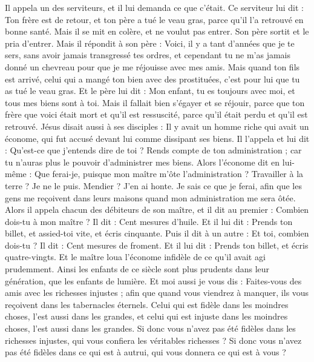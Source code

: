 \begin{multicols}{2}
{Il appela un des serviteurs, et il lui demanda ce que c'était.
Ce serviteur lui dit : Ton frère est de retour, et ton père a tué le veau gras, parce qu'il l'a retrouvé en bonne santé.
Mais il se mit en colère, et ne voulut pas entrer. Son père sortit et le pria d'entrer.
Mais il répondit à son père : Voici, il y a tant d'années que je te sers, sans avoir jamais transgressé tes ordres, et cependant tu ne m'as jamais donné un chevreau pour que je me réjouisse avec mes amis.
Mais quand ton fils est arrivé, celui qui a mangé ton bien avec des prostituées, c’est pour lui que tu as tué le veau gras.
Et le père lui dit : Mon enfant, tu es toujours avec moi, et tous mes biens sont à toi.
Mais il fallait bien s’égayer et se réjouir, parce que ton frère que voici était mort et qu’il est ressuscité, parce qu’il était perdu et qu’il est retrouvé.
\VerseOne{}Jésus disait aussi à ses disciples : Il y avait un homme riche qui avait un économe, qui fut accusé devant lui comme dissipant ses biens.
Il l’appela et lui dit : Qu’est-ce que j'entends dire de toi ? Rends compte de ton administration ; car tu n'auras plus le pouvoir d'administrer mes biens.
Alors l'économe dit en lui-même : Que ferai-je, puisque mon maître m'ôte l'administration ? Travailler à la terre ? Je ne le puis. Mendier ? J’en ai honte.
Je sais ce que je ferai, afin que les gens me reçoivent dans leurs maisons quand mon administration me sera ôtée.
Alors il appela chacun des débiteurs de son maître, et il dit au premier : Combien dois-tu à mon maître ?
Il dit : Cent mesures d'huile. Et il lui dit : Prends ton billet, et assied-toi vite, et écris cinquante.
Puis il dit à un autre : Et toi, combien dois-tu ? Il dit : Cent mesures de froment. Et il lui dit : Prends ton billet, et écris quatre-vingts.
Et le maître loua l'économe infidèle de ce qu'il avait agi prudemment. Ainsi les enfants de ce siècle sont plus prudents dans leur génération, que les enfants de lumière.
Et moi aussi je vous dis : Faites-vous des amis avec les richesses injustes ; afin que quand vous viendrez à manquer, ils vous reçoivent dans les tabernacles éternels.
Celui qui est fidèle dans les moindres choses, l’est aussi dans les grandes, et celui qui est injuste dans les moindres choses, l’est aussi dans les grandes.
Si donc vous n'avez pas été fidèles dans les richesses injustes, qui vous confiera les véritables richesses ?
Si donc vous n’avez pas été fidèles dans ce qui est à autrui, qui vous donnera ce qui est à vous ?
}
\end{multicols}
